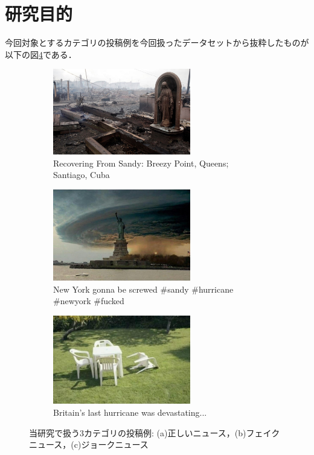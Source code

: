 \section{研究目的}
%
今回対象とするカテゴリの投稿例を今回扱ったデータセットから抜粋したものが以下の図\ref{fig:examples}である．

\begin{figure}[ht]
    \centering
    \begin{subfigure}[b]{0.4\textwidth}
        \includegraphics[width=6cm]{images/real_example.jpg}
        \caption{Recovering From Sandy: Breezy Point, Queens; Santiago, Cuba}
        \label{fig:real}
    \end{subfigure}
    \hfill %
    \begin{subfigure}[b]{0.4\textwidth}
        \includegraphics[width=6cm]{images/fake_example.jpg}
        \caption{New York gonna be screwed \#sandy \#hurricane \#newyork \#fucked}
        \label{fig:fake}
    \end{subfigure}
    \hfill %
    \begin{subfigure}[b]{0.4\textwidth}
        \includegraphics[width=6cm]{images/humor_example.jpg}
        \caption{Britain's last hurricane was devastating...}
        \label{fig:humor}
    \end{subfigure}
    \caption{当研究で扱う3カテゴリの投稿例: (a)正しいニュース，(b)フェイクニュース，(c)ジョークニュース}
    \label{fig:examples}
\end{figure}

